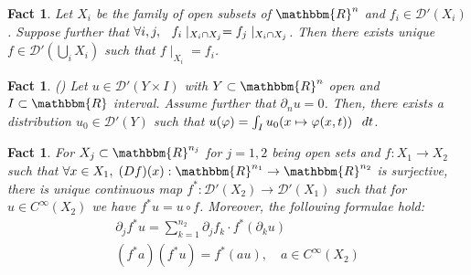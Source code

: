 \documentclass[12pt]{article}
\newtheorem{fact}[proposition]{Fact}
\theoremstyle{remark}
\newcommand{\D}{\mathcal{D}}
\newcommand{\proofexplanation}[1]{(#1)}
\newcommand{\R}{\mathbbm{R}}
\begin{document}
\begin{fact}
\label{fact:localization}{\cite[Thm 2.2.4]{hormander1983analysis}}
Let $X_i$ be the family of open subsets of $\R^n$ and $f_i \in \D' (X_i)$.
Suppose further that $\forall i, j, \hspace{0.75em} f_i \mid_{X_i \cap
X_j} = f_j \mid_{X_i \cap X_j}$. Then there exists unique $f \in \D'
(\bigcup_i X_i)$ such that $f \mid_{X_i} =
f_i$.
\end{fact}

\begin{fact}
{\proofexplanation{{\cite[Thm. 3.1.4']{hormander1983analysis}}}}
\label{fact:sing-q-4}Let $u \in \D' (Y \times I)$ with $Y \subset \R^n$ open
and $I \subset \R$ interval. Assume further that $\partial_n u = 0$. Then,
there exists a distribution $u_0 \in \D' (Y)$ such that $u (\varphi) = \int_I
u_0  (x \mapsto \varphi (x, t))  \hspace{0.75em}
dt$.
\end{fact}

\begin{fact}
\label{lem67:fact-pullback}{\cite[thm.
6.1.2]{hormander1983analysis}} For $X_j \subset \mathbbm{R}^{n_j}$ for $j = 1,
2$ being open sets and $f : X_1 \rightarrow X_2$ such that $\forall x \in X_1,
\; (D f) (x) : \mathbbm{R}^{n_1} \rightarrow \mathbbm{R}^{n_2}$ is surjective,
there is unique continuous map $f^{\ast} : \mathcal{D}' (X_2) \rightarrow
\mathcal{D}' (X_1)$ such that for $u \in C^{\infty} (X_2)$ we have $f^{\ast} u
= u \circ f$. Moreover, the following formulae hold:
\begin{eqnarray}
  & \partial_j f^{\ast} u = \sum_{k = 1}^{n_2} \partial_j f_k \cdot f^{\ast}
  (\partial_k u) &  \nonumber\\
  & (f^{\ast} a) (f^{\ast} u) = f^{\ast} (a u), \quad a \in C^{\infty} (X_2)
  &  \nonumber
\end{eqnarray}
\end{fact}
\end{document}
